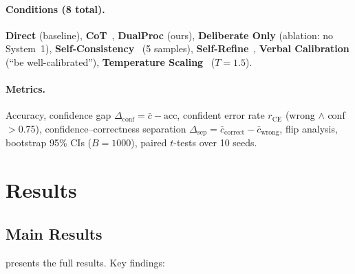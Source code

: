 \documentclass[10pt,twocolumn,letterpaper]{article}
\newcommand{\method}{DualProc}
\newcommand{\sone}{System~1}
\newcommand{\confgap}{\ensuremath{\Delta_{\text{conf}}}}
\newcommand{\cer}{\ensuremath{r_{\text{CE}}}}
\newcommand{\dsep}{\ensuremath{\Delta_{\text{sep}}}}
\begin{document}
\paragraph{Conditions (8 total).}
\textbf{Direct} (baseline), \textbf{CoT}~\cite{wei2022chain}, \textbf{\method{}} (ours), \textbf{Deliberate Only} (ablation: no \sone{}), \textbf{Self-Consistency}~\cite{wang2023selfconsistency} (5 samples), \textbf{Self-Refine}~\cite{madaan2023selfrefine}, \textbf{Verbal Calibration} (``be well-calibrated''), \textbf{Temperature Scaling}~\cite{guo2017calibration} ($T\!=\!1.5$).

\paragraph{Metrics.} Accuracy, confidence gap $\confgap = \bar{c} - \text{acc}$, confident error rate $\cer$ (wrong $\wedge$ conf$>$0.75), confidence--correctness separation $\dsep = \bar{c}_{\text{correct}} - \bar{c}_{\text{wrong}}$, flip analysis, bootstrap 95\% CIs ($B\!=\!1000$), paired $t$-tests over 10 seeds.

\section{Results}
\label{sec:results}

\subsection{Main Results}

 presents the full results. Key findings:
\end{document}
